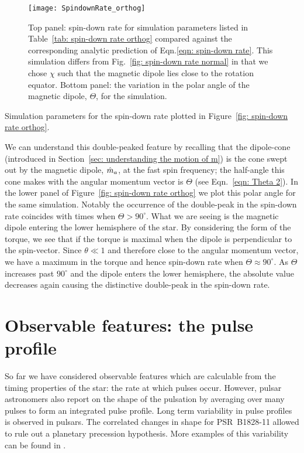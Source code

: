 \documentclass[../full_thesis/full_thesis.tex]{subfiles}
\newcommand{\thisdir}{../inertial_frame}
\begin{document}
\begin{figure}[htb]
\centering
\texttt{[image: SpindownRate\_orthog]}
\caption{Top panel: spin-down rate for simulation parameters listed in Table~\ref{tab:
spin-down rate orthog} compared against the corresponding analytic prediction
of Eqn.\eqref{eqn: spin-down rate}. This simulation differs from
Fig.~\ref{fig: spin-down rate normal} in that we chose $\chi$ such that the
magnetic dipole lies close to the rotation equator. Bottom panel: the variation
in the polar angle of the magnetic dipole, $\Theta$, for the simulation.}
\label{fig: spin-down rate orthog}
\end{figure}

\begin{table}[htb]
\centering

\caption{Simulation parameters for the spin-down rate plotted in Figure~\ref{fig:
spin-down rate orthog}.}
\label{tab: spin-down rate orthog}
\end{table}

We can understand this double-peaked feature by recalling that the dipole-cone
(introduced in Section~\ref{sec: understanding the motion of m}) is the
cone swept out by the magnetic dipole, $\hat{m}_a$, at the fast spin frequency; the
half-angle this cone makes with the angular momentum vector is $\Theta$ (see
Eqn.~\eqref{eqn: Theta 2}).  In the lower panel of Figure~\ref{fig: spin-down
rate orthog} we plot this polar angle for the same simulation. Notably the
occurrence of the double-peak in the spin-down rate coincides with times when
$\Theta > 90^{\circ}$. What we are seeing is the magnetic dipole entering the
lower hemisphere of the star. By considering the form of the
\citet{Deutsch1955} torque, we see that if the torque is maximal when the
dipole is perpendicular to the spin-vector. Since $\theta \ll 1$ and therefore
close to the angular momentum vector, we have a maximum in the torque and hence
spin-down rate when $\Theta \approx 90^{\circ}$. As $\Theta$ increases past
$90^{\circ}$ and the dipole enters the lower hemisphere, the absolute value
decreases again causing the distinctive double-peak in the spin-down rate.


\section{Observable features: the pulse profile}
\label{sec: observable features: shape}

So far we have considered observable features which are calculable from the
timing properties of the star: the rate at which pulses occur. However, pulsar
astronomers also report on the shape of the pulsation by averaging over many
pulses to form an integrated pulse profile.  Long term variability in pulse
profiles is observed in pulsars. The correlated changes in shape for
PSR~B1828-11 allowed \citet{Stairs2000} to rule out a planetary precession
hypothesis. More examples of this variability can be found in \citet{Lyne2010}.
\end{document}
